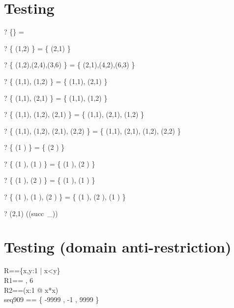 \documentclass{article}
\newcommand{\negate}{-}
\begin{document}
\section{Testing \inv}
\begin{zed} \vdash? \{\} \inv = \emptyset[\nat \cross \num] \end{zed}
\begin{zed} \vdash? \{ (1,2) \} \inv = \{ (2,1) \} \end{zed}
\begin{zed} \vdash? \{ (1,2),(2,4),(3,6) \} \inv = \{ (2,1),(4,2),(6,3) \} \end{zed}
\begin{zed} \vdash? \{ (1,1), (1,2) \} \inv = \{ (1,1), (2,1) \} \end{zed}
\begin{zed} \vdash? \{ (1,1), (2,1) \} \inv = \{ (1,1), (1,2) \} \end{zed}
\begin{zed} \vdash? \{ (1,1), (1,2), (2,1) \} \inv = \{ (1,1), (2,1), (1,2) \} \end{zed}
\begin{zed} \vdash? \{ (1,1), (1,2), (2,1), (2,2) \} \inv = \{ (1,1), (2,1), (1,2), (2,2) \} \end{zed}
\begin{zed} \vdash? \{ (1 ) \} \inv = \{ (2 ) \} \end{zed}
\begin{zed} \vdash? \{ (1 ), (1 ) \} \inv = \{ (1 ), (2 ) \} \end{zed}
\begin{zed} \vdash? \{ (1 ), (2 ) \} \inv = \{ (1 ), (1 ) \} \end{zed}
\begin{zed} \vdash? \{ (1 ), (1 ), (2 ) \} \inv = \{ (1 ), (2 ), (1 ) \} \end{zed}
\begin{zed} \vdash? (2,1) \in ((succ~\_)\inv) \end{zed}

\section{Testing \ndres (domain anti-restriction)}
\begin{zed}
  R==\{x,y:1  | x<y\} \\
  R1== , 6  \rangle\\
  R2==(\lambda x:1  @ x*x)\\
  seq909 == \{ \negate 9999 , \negate 1 , 9999 \mapsto \negate 9999 \}
\end{zed}
\end{document}
